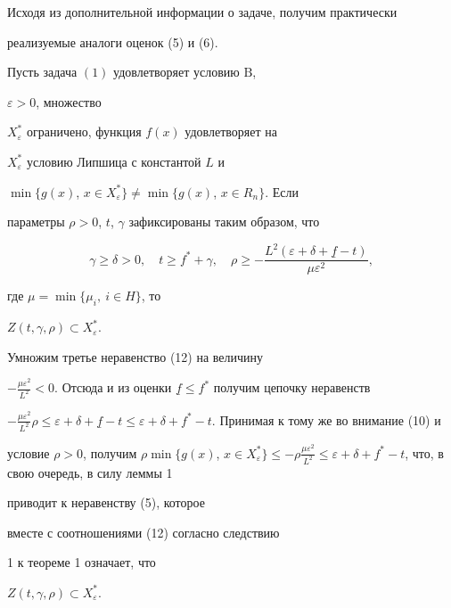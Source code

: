 Исходя из дополнительной информации о задаче, получим практически


реализуемые аналоги оценок (5) и (6).





\begin{thm}


Пусть задача $(1)$ удовлетворяет условию $\mathrm B$,


$\varepsilon>0$, множество 


$X_{\varepsilon}^*$ ограничено, функция $f(x)$ удовлетворяет на


$X_{\varepsilon}^*$ условию Липшица с константой $L$ и 


$\min\{g(x)$, $x\in X_{\varepsilon}^*\}\ne\min\{g(x)$, $x\in R_n\}$. Если


параметры $\rho>0$, $t$, $\gamma$ зафиксированы таким образом, что 


\begin{equation} 


\gamma\ge\delta>0, \quad t\ge f^*+\gamma, \quad


\rho\ge-\frac{L^2(\varepsilon+\delta+\underline{f}-t)}{\mu\varepsilon^2},


\end{equation}


где $\mu=\min\{\mu_i,\ i\in H\}$, то 


$Z(t,\gamma,\rho)\subset X_{\varepsilon}^*$. 


\end{thm}





\begin{pf}


Умножим третье неравенство (12) на величину


$-\frac{\mu\varepsilon^2}{L^2}<0$. Отсюда и из оценки $\underline{f}\le


f^*$ получим цепочку неравенств


$-\frac{\mu\varepsilon^2}{L^2}\rho\le\varepsilon+\delta+\underline{f}-t


\le\varepsilon+\delta+f^*-t$. Принимая к тому же во внимание (10) и


условие $\rho>0$, получим $\rho\min\{g(x)$, $x\in


X_{\varepsilon}^*\}\le-\rho\frac{\mu\varepsilon^2}{L^2}\le


\varepsilon+\delta+f^*-t$, что, в свою очередь, в силу леммы 1


приводит к неравенству (5), которое


вместе с соотношениями (12) согласно следствию


1 к теореме 1 означает, что


$Z(t,\gamma,\rho)\subset X_{\varepsilon}^*$.


\end{pf}





